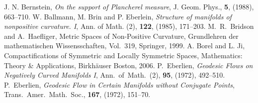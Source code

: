  J. N. Bernstein, \textit{On the support of Plancherel measure}, J. Geom. Phys., \textbf{5}, (1988), 663--710.
 W. Ballmann, M. Brin and P. Eberlein, \textit{Structure of manifolds of nonpositive curvature. I}, Ann. of Math. (2),  \textbf{122}, (1985), 171--203.
 M.~R.~Bridson and A.~Haefliger, Metric Spaces of Non-Positive Curvature, Grundlehren der mathematischen Wissensschaften, Vol.~319, Springer, 1999.
 A. Borel and L. Ji, Compactifications of Symmetric and Locally Symmetric Spaces, Mathematics: Theory \& Applications,  Birkhäuser  Boston, 2006.
 P.~Eberlien, \textit{Geodesic Flows on Negatively Curved Manifolds I}, Ann.~of~Math.~(2), \textbf{95}, (1972), 492--510.
 P.~Eberlien, \textit{Geodesic Flow in Certain Manifolds without Conjugate Points}, Trans.~Amer.~Math.~Soc., \textbf{167}, (1972), 151--70.
